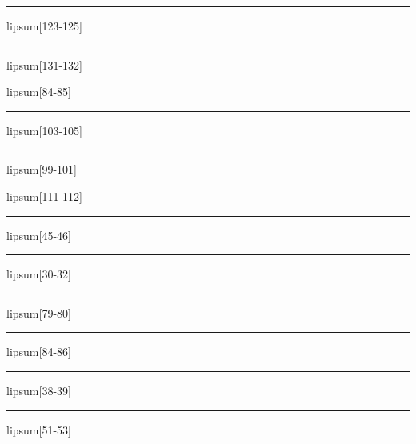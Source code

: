 \documentclass[11pt,a4paper]{article}
\begin{document}
\begin{simplewrap}
  \textcolor{blue!41}{\rule{3.1cm}{5.8cm}}
\end{simplewrap}
lipsum[123-125]

\begin{simplewrap}
  \textcolor{cyan!28}{\rule{5.3cm}{6.8cm}}
\end{simplewrap}
lipsum[131-132]

lipsum[84-85]

\begin{simplewrap}
  \textcolor{magenta!51}{\rule{3.2cm}{4.4cm}}
\end{simplewrap}
lipsum[103-105]

\begin{simplewrap}
  \textcolor{magenta!49}{\rule{3.7cm}{3.3cm}}
\end{simplewrap}
lipsum[99-101]

lipsum[111-112]

\begin{simplewrap}
  \textcolor{olive!46}{\rule{5.4cm}{6.4cm}}
\end{simplewrap}
lipsum[45-46]

\begin{simplewrap}
  \textcolor{green!57}{\rule{5.8cm}{6.6cm}}
\end{simplewrap}
lipsum[30-32]

\begin{simplewrap}
  \textcolor{blue!30}{\rule{4.7cm}{8.6cm}}
\end{simplewrap}
lipsum[79-80]

\begin{simplewrap}
  \textcolor{green!48}{\rule{3.3cm}{8.5cm}}
\end{simplewrap}
lipsum[84-86]

\begin{simplewrap}
  \textcolor{blue!15}{\rule{3.7cm}{3.1cm}}
\end{simplewrap}
lipsum[38-39]

\begin{simplewrap}
  \textcolor{blue!44}{\rule{3.9cm}{6.9cm}}
\end{simplewrap}
lipsum[51-53]
\end{document}

